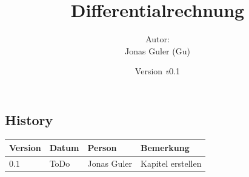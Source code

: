 \documentclass[11pt,oneside]{article}
\newcommand{\Skriptname}{Differentialrechnung}
\newcommand{\Autor}{Jonas Guler (Gu)}
\newcommand{\version}{\textit{v}0.1}
\begin{document}
\begin{titlepage}
	\clearpage
	\title{\Huge\textbf{\Skriptname} \\[1cm]}
	\author{Autor:\\ \Autor}
	\date{\normalsize {Version \version}\\ \datelong}
	\maketitle
	\thispagestyle{empty}
	\vfill
	\tableofcontents
\end{titlepage}



\newpage
\subsection*{History}
\begin{table}[H]
	\centering
	\begin{tabular}{|p{13mm}|p{20mm}|p{30mm}|p{70mm}|}\hline
		Version & Datum & Person & Bemerkung \\\hline
		$0.1$ & ToDo & Jonas Guler & Kapitel erstellen \\\hline
	\end{tabular}
\end{table}
\end{document}
